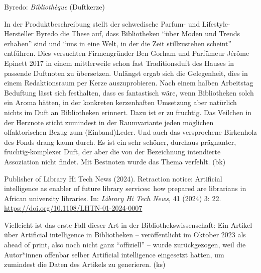 \documentclass[a4paper,
fontsize=11pt,
oneside,
numbers=noperiodatend,
parskip=half-,
bibliography=totoc,
final
]{scrartcl}
\begin{document}
Byredo: \emph{Bibliothèque} (Duftkerze)

In der Produktbeschreibung stellt der schwedische Parfum- und
Lifestyle-Hersteller Byredo die These auf, dass Bibliotheken
\enquote{über Moden und Trends erhaben} sind und \enquote{uns in eine
Welt, in der die Zeit stillzustehen scheint} entführen. Dies versuchten
Firmengründer Ben Gorham und Parfümeur Jérôme Epinett 2017 in einem
mittlerweile schon fast Traditionsduft des Hauses in passende Duftnoten
zu übersetzen. Unlängst ergab sich die Gelegenheit, dies in einem
Redaktionsraum per Kerze auszuprobieren. Nach einem halben Arbeitstag
Beduftung lässt sich festhalten, dass es fantastisch wäre, wenn
Bibliotheken solch ein Aroma hätten, in der konkreten kerzenhaften
Umsetzung aber natürlich nichts im Duft an Bibliotheken erinnert. Dazu
ist er zu fruchtig. Das Veilchen in der Herznote sticht zumindest in der
Raumvariante jeden möglichen olfaktorischen Bezug zum (Einband)Leder.
Und auch das versprochene Birkenholz des Fonds drang kaum durch. Es ist
ein sehr schöner, durchaus prägnanter, fruchtig-komplexer Duft, der aber
die von der Bezeichnung intendierte Assoziation nicht findet. Mit
Bestnoten wurde das Thema verfehlt. (bk)

Publisher of Library Hi Tech News (2024). Retraction notice: Artificial
intelligence as enabler of future library services: how prepared are
librarians in African university libraries. In: \emph{Library Hi Tech
News}, 41 (2024) 3: 22. \url{https://doi.org/10.1108/LHTN-01-2024-0007}

Vielleicht ist das erste Fall dieser Art in der Bibliothekswissenschaft:
Ein Artikel über Artificial intelligence in Bibliotheken --
veröffentlicht im Oktober 2023 als ahead of print, also noch nicht ganz
\enquote{offiziell} -- wurde zurückgezogen, weil die Autor*innen
offenbar selber Artificial intelligence eingesetzt hatten, um zumindest
die Daten des Artikels zu generieren. (ks)

\end{document}
